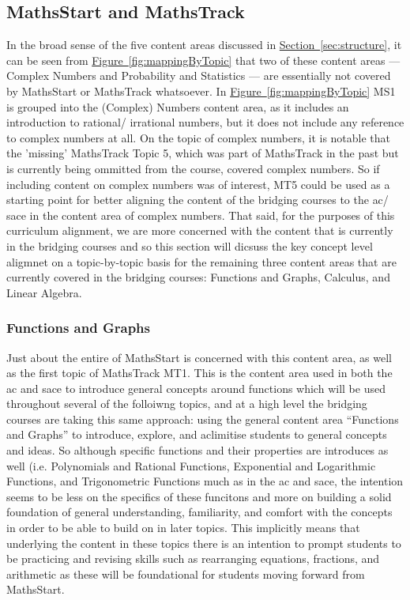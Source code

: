 \documentclass[twoside,12pt,a4paper]{report}
\newcommand{\refsec}[1]{\hyperref[sec:#1]{Section~\ref{sec:#1}}}
\newcommand{\reffig}[1]{\hyperref[fig:#1]{Figure~\ref{fig:#1}}}
\begin{document}
\subsection{MathsStart and MathsTrack}
\label{sec:MSMTmapping}

In the broad sense of the five content areas discussed in \refsec{structure}, it can be seen from \reffig{mappingByTopic} that two of these content areas --- Complex Numbers and Probability and Statistics --- are essentially not covered by MathsStart or MathsTrack whatsoever. In \reffig{mappingByTopic} MS1 is grouped into the (Complex) Numbers content area, as it includes an introduction to rational/ irrational numbers, but it does not include any reference to complex numbers at all. On the topic of complex numbers, it is notable that the 'missing' MathsTrack Topic 5, which was part of MathsTrack in the past but is currently being ommitted from the course, covered complex numbers. So if including content on complex numbers was of interest, MT5 could be used as a starting point for better aligning the content of the bridging courses to the \gls{ac}/ \gls{sace} in the content area of complex numbers. That said, for the purposes of this curriculum alignment, we are more concerned with the content that is currently in the bridging courses and so this section will dicsuss the key concept level aligmnet on a topic-by-topic basis for the remaining three content areas that are currently covered in the bridging courses: Functions and Graphs, Calculus, and Linear Algebra.

\subsubsection{Functions and Graphs} 

Just about the entire of MathsStart is concerned with this content area, as well as the first topic of MathsTrack MT1. This is the content area used in both the \gls{ac} and \gls{sace} to introduce general concepts around functions which will be used throughout several of the folloiwng topics, and at a high level the bridging courses are taking this same approach: using the general content area ``Functions and Graphs'' to introduce, explore, and aclimitise students to general concepts and ideas. So although specific functions and their properties are introduces as well (i.e. Polynomials and Rational Functions, Exponential and Logarithmic Functions, and Trigonometric Functions much as in the \gls{ac} and \gls{sace}, the intention seems to be less on the specifics of these funcitons and more on building a solid foundation of general understanding, familiarity, and comfort with the concepts in order to be able to build on in later topics. This implicitly means that underlying the content in these topics there is an intention to prompt students to be practicing and revising skills such as rearranging equations, fractions, and arithmetic as these will be foundational for students moving forward from MathsStart. 
\end{document}
